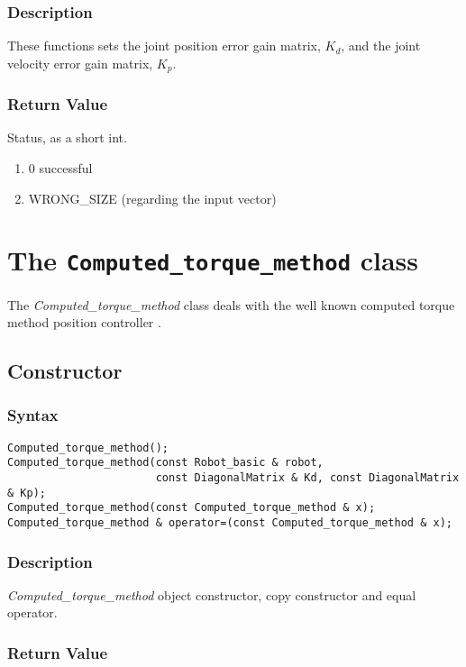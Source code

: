 \documentclass[11pt,fleqn,letterpaper]{report}
\begin{document}
\subsubsection*{Description}   
These functions sets the joint position error gain matrix, $K_d$, and
the joint velocity error gain matrix, $K_p$.
\subsubsection*{Return Value}

Status, as a short int.
\begin{enumerate}
\item[] 0 successful
\item[] WRONG\_SIZE (regarding the input vector)
\end{enumerate}

\newpage

\section{The \texttt{Computed\_torque\_method} class}

The \emph{Computed\_torque\_method} class deals with the well known
computed torque method position controller \cite{Fu87}.

\subsection*{Constructor}
\subsubsection*{Syntax}
\begin{verbatim}
Computed_torque_method();
Computed_torque_method(const Robot_basic & robot, 
                       const DiagonalMatrix & Kd, const DiagonalMatrix & Kp);
Computed_torque_method(const Computed_torque_method & x);
Computed_torque_method & operator=(const Computed_torque_method & x);
\end{verbatim}

\subsubsection*{Description}   
\emph{Computed\_torque\_method} object constructor, copy constructor
and equal operator.

\subsubsection*{Return Value}
\end{document}
